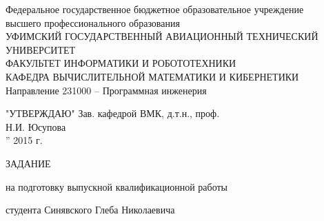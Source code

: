 \begin{titlepage}
\newpage

\begin{center}
Федеральное государственное бюджетное образовательное учреждение\\
высшего профессионального образования \\
\vspace{0.5cm}
УФИМСКИЙ ГОСУДАРСТВЕННЫЙ АВИАЦИОННЫЙ ТЕХНИЧЕСКИЙ УНИВЕРСИТЕТ\\
\vspace{0.5cm}
ФАКУЛЬТЕТ  ИНФОРМАТИКИ  И  РОБОТОТЕХНИКИ \\
\vspace{0.5cm}
КАФЕДРА  ВЫЧИСЛИТЕЛЬНОЙ  МАТЕМАТИКИ  И  КИБЕРНЕТИКИ\\
\vspace{0.5cm}
Направление 231000 – Программная инженерия
\end{center}
\vspace{0.5cm}
\begin{flushright}
"УТВЕРЖДАЮ"
Зав. кафедрой  ВМК, д.т.н., проф.\\
\vspace{0.5cm}
\underline{\hspace{5cm}} Н.И. Юсупова\\
\underline{\hspace{1cm}}”\underline{\hspace{5cm}} 2015 г.
\end{flushright}
\vspace{1cm}

\begin{center}
  \Large{ ЗАДАНИЕ }
\vspace{0.5cm}

на подготовку выпускной квалификационной работы
\end{center}

студента Синявского Глеба Николаевича


\end{titlepage}
